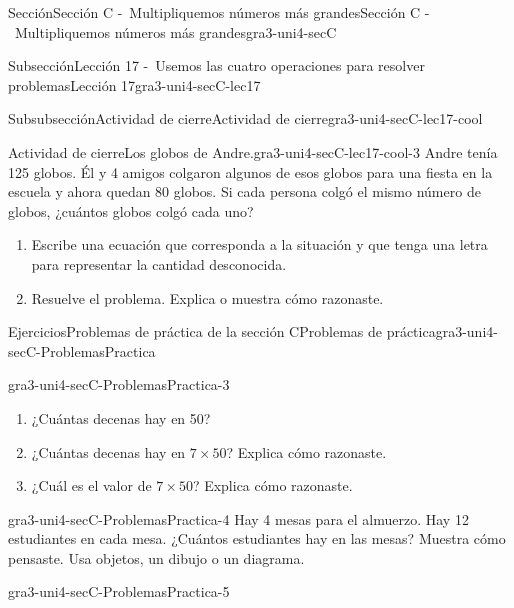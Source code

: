 \documentclass[twoside,14pt,]{extarticle}
\begin{document}
\begin{sectionptx}{Sección}{Sección C -~Multipliquemos números más grandes}{}{Sección C -~Multipliquemos números más grandes}{}{}{gra3-uni4-secC}
\begin{subsectionptx}{Subsección}{Lección 17 -~Usemos las cuatro operaciones para resolver problemas}{}{Lección 17}{}{}{gra3-uni4-secC-lec17}
\typeout{************************************************}
%
\begin{subsubsectionptx}{Subsubsección}{Actividad de cierre}{}{Actividad de cierre}{}{}{gra3-uni4-secC-lec17-cool}
\begin{project}{Actividad de cierre}{Los globos de Andre.}{gra3-uni4-secC-lec17-cool-3}%
Andre tenía 125 globos. Él y 4 amigos colgaron algunos de esos globos para una fiesta en la escuela y ahora quedan 80 globos. Si cada persona colgó el mismo número de globos, ¿cuántos globos colgó cada uno?%
%
\begin{enumerate}
\item{}Escribe una ecuación que corresponda a la situación y que tenga una letra para representar la cantidad desconocida.%
\item{}Resuelve el problema. Explica o muestra cómo razonaste.%
\end{enumerate}
\end{project}%
\end{subsubsectionptx}
\end{subsectionptx}
%
%
\typeout{************************************************}
\typeout{************************************************}
%
\begin{exercises-subsection}{Ejercicios}{Problemas de práctica de la sección C}{}{Problemas de práctica}{}{}{gra3-uni4-secC-ProblemasPractica}
\begin{divisionexercise}{1}{}{}{gra3-uni4-secC-ProblemasPractica-3}%
%
\begin{enumerate}[label=(\alph*)]
\item{}¿Cuántas decenas hay en 50?%
\item{}¿Cuántas decenas hay en \(7 \times 50\)? Explica cómo razonaste.%
\item{}¿Cuál es el valor de \(7 \times 50\)? Explica cómo razonaste.%
\end{enumerate}
\end{divisionexercise}%
\begin{divisionexercise}{2}{}{}{gra3-uni4-secC-ProblemasPractica-4}%
Hay 4 mesas para el almuerzo. Hay 12 estudiantes en cada mesa. ¿Cuántos estudiantes hay en las mesas? Muestra cómo pensaste. Usa objetos, un dibujo o un diagrama.%
\end{divisionexercise}%
\begin{divisionexercise}{3}{}{}{gra3-uni4-secC-ProblemasPractica-5}%
\begin{sidebyside}{2}{0.0125}{0.0125}{0.025}%

\end{sidebyside}
\end{divisionexercise}
\end{exercises-subsection}
\end{sectionptx}
\end{document}
